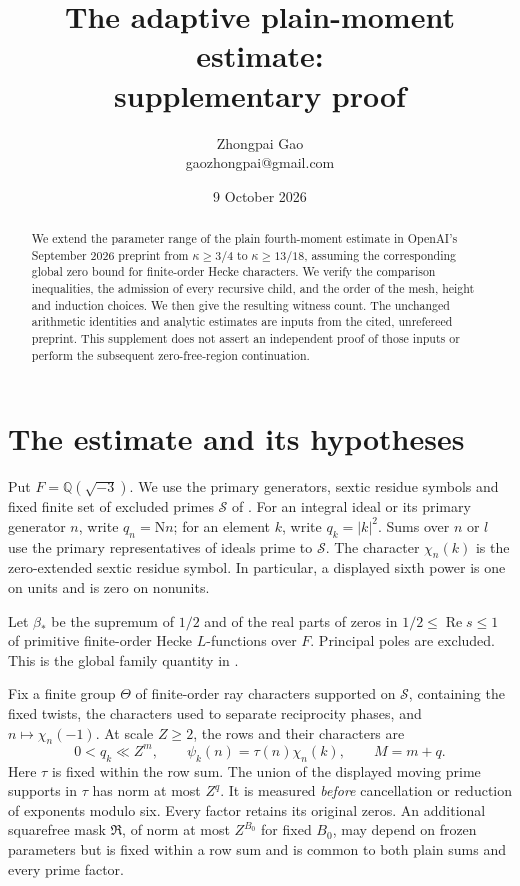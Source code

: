 \documentclass[11pt]{article}
\title{The adaptive plain-moment estimate:\\supplementary proof}
\author{Zhongpai Gao\\\small gaozhongpai@gmail.com}
\date{9 October 2026}
\theoremstyle{remark}
\newcommand{\Q}{\mathbb Q}
\newcommand{\N}{\mathrm N}
\newcommand{\Rea}{\operatorname{Re}}
\begin{document}
\maketitle
\begin{abstract}
We extend the parameter range of the plain fourth-moment estimate in
OpenAI's September 2026 preprint from $\kappa\ge3/4$ to
$\kappa\ge13/18$, assuming the corresponding global zero bound for
finite-order Hecke characters. We verify the comparison inequalities,
the admission of every recursive child, and the order of the mesh,
height and induction choices. We then give the resulting witness count.
The unchanged arithmetic identities and analytic estimates are inputs
from the cited, unrefereed preprint. This supplement does not assert
an independent proof of those inputs or perform the subsequent
zero-free-region continuation.
\end{abstract}

\section{The estimate and its hypotheses}\label{adp:statement}

Put $F=\Q(\sqrt{-3})$. We use the primary generators, sextic residue
symbols and fixed finite set of excluded primes $\mathcal S$ of
\cite[Sections 4 and 14]{OAI26}. For an integral ideal or its primary
generator $n$, write $q_n=\N n$; for an element $k$, write
$q_k=|k|^2$. Sums over $n$ or $l$ use the primary representatives of
ideals prime to $\mathcal S$. The character $\chi_n(k)$ is the
zero-extended sextic residue symbol. In particular, a displayed sixth
power is one on units and is zero on nonunits.

Let $\beta_*$ be the supremum of $1/2$ and of the real parts of zeros
in $1/2\le\Rea s\le1$ of primitive finite-order Hecke $L$-functions
over $F$. Principal poles are excluded. This is the global family
quantity in \cite[Section 2, (2.1)]{OAI26}.

Fix a finite group $\Theta$ of finite-order ray characters supported
on $\mathcal S$, containing the fixed twists, the characters used to
separate reciprocity phases, and $n\mapsto\chi_n(-1)$. At scale
$Z\ge2$, the rows and their characters are
\[
 0<q_k\ll Z^m,\qquad \psi_k(n)=\tau(n)\chi_n(k),\qquad M=m+q .
\]
Here $\tau$ is fixed within the row sum. The union of the displayed
moving prime supports in $\tau$ has norm at most $Z^q$. It is measured
\emph{before} cancellation or reduction of exponents modulo six.
Every factor retains its original zeros. An additional squarefree
mask $\mathfrak R$, of norm at most $Z^{B_0}$ for fixed $B_0$, may
depend on frozen parameters but is fixed within a row sum and is
common to both plain sums and every prime factor.
\end{document}
